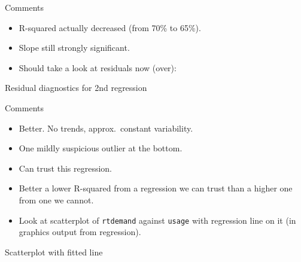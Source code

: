 \documentclass[unknownkeysallowed]{beamer}\usepackage[]{graphicx}\usepackage[]{color}
\begin{document}
\begin{frame}[fragile]{Comments}

  \begin{itemize}
  \item R-squared actually decreased (from 70\% to 65\%).
  \item Slope still strongly significant.
  \item Should take a look at residuals now (over):

  \end{itemize}

\end{frame}

\begin{frame}[fragile]{Residual diagnostics for 2nd regression}

  
\end{frame}

\begin{frame}[fragile]{Comments}

  \begin{itemize}
  \item Better. No trends, approx.\ constant variability.
  \item One mildly suspicious outlier at the bottom.
  \item Can trust this regression.
  \item Better a lower R-squared from a regression we can trust than a
    higher one from one we cannot.
  \item Look at scatterplot of \texttt{rtdemand} against \texttt{usage}
    with regression line on it (in graphics output from regression).

  \end{itemize}
  
\end{frame}

\begin{frame}[fragile]{Scatterplot with fitted line}

  
\end{frame}
\end{document}
